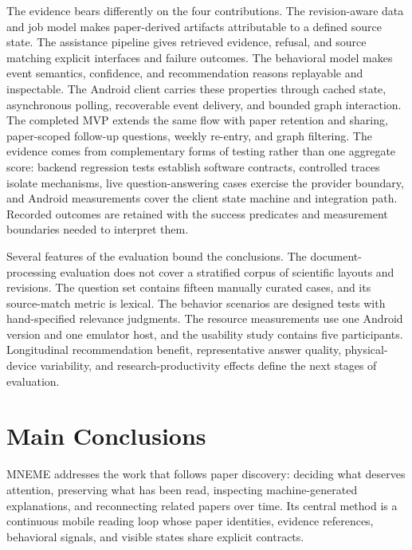 The evidence bears differently on the four contributions.
The revision-aware data and job model makes paper-derived artifacts attributable to a defined source state.
The assistance pipeline gives retrieved evidence, refusal, and source matching explicit interfaces and failure outcomes.
The behavioral model makes event semantics, confidence, and recommendation reasons replayable and inspectable.
The Android client carries these properties through cached state, asynchronous polling, recoverable event delivery, and bounded graph interaction. The completed MVP extends the same flow with paper retention and sharing, paper-scoped follow-up questions, weekly re-entry, and graph filtering.
The evidence comes from complementary forms of testing rather than one aggregate score: backend regression tests establish software contracts, controlled traces isolate mechanisms, live question-answering cases exercise the provider boundary, and Android measurements cover the client state machine and integration path.
Recorded outcomes are retained with the success predicates and measurement
boundaries needed to interpret them.

Several features of the evaluation bound the conclusions.
The document-processing evaluation does not cover a stratified corpus of scientific layouts and revisions.
The question set contains fifteen manually curated cases, and its source-match metric is lexical.
The behavior scenarios are designed tests with hand-specified relevance judgments.
The resource measurements use one Android version and one emulator host, and the usability study contains five participants.
Longitudinal recommendation benefit, representative answer quality, physical-device variability, and research-productivity effects define the next stages of evaluation.

\section{Main Conclusions}

MNEME addresses the work that follows paper discovery: deciding what deserves attention, preserving what has been read, inspecting machine-generated explanations, and reconnecting related papers over time.
Its central method is a continuous mobile reading loop whose paper identities, evidence references, behavioral signals, and visible states share explicit contracts.


